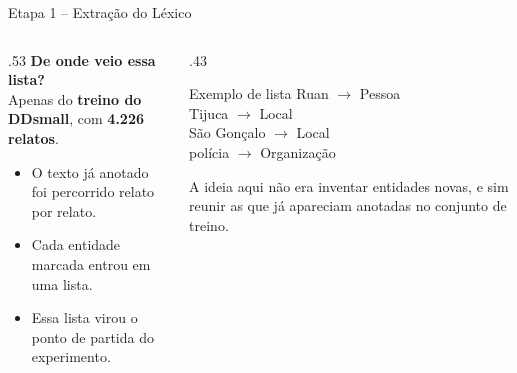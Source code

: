 \documentclass[aspectratio=169, 9pt]{beamer}
\begin{document}
\begin{frame}{Etapa 1 -- Extração do Léxico}
  \begin{columns}[T]
    \begin{column}{.53\textwidth}
      \textbf{De onde veio essa lista?}\\[4pt]
      Apenas do \textbf{treino do DDsmall}, com \textbf{4.226 relatos}.

      \vspace{8pt}
      \begin{itemize}
        \item O texto já anotado foi percorrido relato por relato.
        \item Cada entidade marcada entrou em uma lista.
        \item Essa lista virou o ponto de partida do experimento.
      \end{itemize}
    \end{column}

    \begin{column}{.43\textwidth}
      \begin{exampleblock}{Exemplo de lista}
        \footnotesize
        Ruan $\rightarrow$ Pessoa\\
        Tijuca $\rightarrow$ Local\\
        São Gonçalo $\rightarrow$ Local\\
        polícia $\rightarrow$ Organização
      \end{exampleblock}

      \vspace{6pt}
      \small
      A ideia aqui não era inventar entidades novas, e sim reunir as que já apareciam anotadas no conjunto de treino.
    \end{column}
  \end{columns}
\end{frame}
\end{document}
